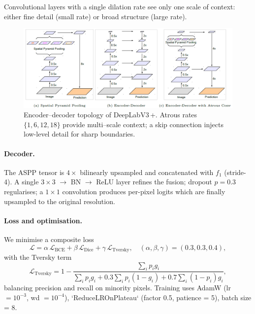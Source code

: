 Convolutional layers with a single dilation rate see only one scale of
context: either fine detail (small rate) or broad structure (large rate).


\begin{figure}
  \centering
  \includegraphics[width=.9\linewidth]{figs/aspp.png}
  \caption{Encoder–decoder topology of DeepLabV3\,+. Atrous rates
           \(\{1,6,12,18\}\) provide multi–scale context; a skip connection
           injects low-level detail for sharp boundaries.}
  \label{fig:deeplabv3p}
\end{figure}

\paragraph{Decoder.}
The ASPP tensor is $4\times$ bilinearly upsampled and concatenated with
\(f_1\) (stride-4).  
A single \(3\times3\) \(\rightarrow\) BN \(\rightarrow\) ReLU layer refines the
fusion; dropout \(p{=}0.3\) regularises; a \(1\times1\) convolution produces
per-pixel logits which are finally upsampled to the original resolution.

\paragraph{Loss and optimisation.}
We minimise a composite loss
\begin{equation}
  \mathcal{L} = \alpha\,\mathcal{L}_{\text{BCE}} +
                \beta\,\mathcal{L}_{\text{Dice}} +
                \gamma\,\mathcal{L}_{\text{Tversky}},
  \quad (\alpha,\beta,\gamma)=(0.3,0.3,0.4),
\end{equation}
with the Tversky term
\begin{equation}
\mathcal{L}_{\text{Tversky}}
  = 1 - \frac{\!\!\sum_i p_i g_i}
             {\sum_i p_i g_i
              + 0.3\sum_i p_i(1-g_i)
              + 0.7\sum_i (1-p_i)g_i},
\end{equation}
balancing precision and recall on minority pixels.  
Training uses AdamW (lr \(=10^{-3}\), wd \(=10^{-4}\)),
`ReduceLROnPlateau` (factor 0.5, patience = 5), batch size = 8.

